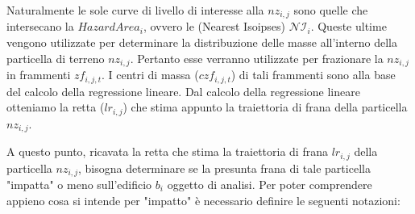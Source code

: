 Naturalmente le sole curve di livello di interesse alla $nz_{i,j}$ sono quelle che intersecano la $HazardArea_i$, ovvero le (Nearest Isoipses) $\mathcal{NI}_i$.
Queste ultime vengono utilizzate per determinare la distribuzione delle masse all'interno della particella di terreno $nz_{i,j}$. Pertanto esse verranno utilizzate per frazionare la $nz_{i,j}$  in frammenti $zf_{i,j,t}$. I centri di massa ($czf_{i,j,t}$) di tali frammenti sono alla base del calcolo della regressione lineare. Dal calcolo della regressione lineare otteniamo la retta ($lr_{i,j}$) che stima appunto la traiettoria di frana della particella $nz_{i,j}$. 

A questo punto, ricavata la retta che stima la traiettoria di frana $lr_{i,j}$ della particella $nz_{i,j}$, bisogna determinare se la presunta frana di tale particella "impatta" o meno sull'edificio $b_i$ oggetto di analisi. Per poter comprendere appieno cosa si intende per "impatto" è necessario definire le seguenti notazioni:

